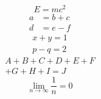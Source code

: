 \documentclass{article}
\begin{document}
\begin{equation}
  E = mc^2
\end{equation}
\begin{align}
  a &= b + c \\
  d &= e - f
\end{align}
\begin{gather}
  x + y = 1 \\
  p - q = 2
\end{gather}
\begin{multline}
  A + B + C + D + E + F \\
  + G + H + I = J
\end{multline}
\begin{equation*}
  \lim_{n \to \infty} \frac{1}{n} = 0
\end{equation*}
\end{document}
